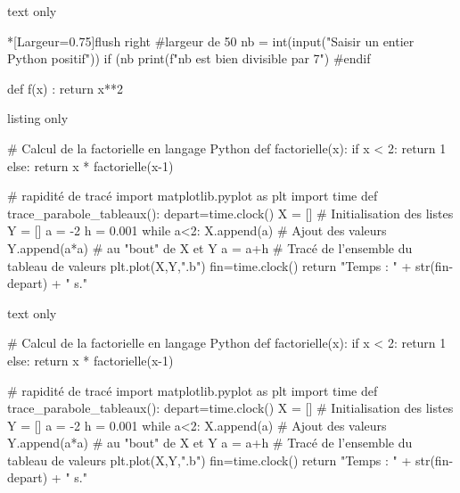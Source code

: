 \begin{PresCodeSortiePL}{text only}
\begin{CodePythonLstAlt}*[Largeur=0.75\linewidth]{flush right}
#largeur de 50%
nb = int(input("Saisir un entier Python positif"))
if (nb %
	print(f"{nb} est bien divisible par 7")
#endif

def f(x) :
	return x**2
\end{CodePythonLstAlt}
\end{PresCodeSortiePL}

\begin{PresCodeTexPL}{listing only}
\begin{scontents}[overwrite,write-out=testscript.py]
# Calcul de la factorielle en langage Python
def factorielle(x):
	if x < 2:
		return 1
	else:
		return x * factorielle(x-1)

# rapidité de tracé
import matplotlib.pyplot as plt
import time
def trace_parabole_tableaux():
	depart=time.clock()
	X = [] # Initialisation des listes
	Y = []
	a = -2
	h = 0.001
	while a<2:
		X.append(a) # Ajout des valeurs
		Y.append(a*a) # au "bout" de X et Y
		a = a+h
	# Tracé de l'ensemble du tableau de valeurs
	plt.plot(X,Y,".b")
	fin=time.clock()
	return "Temps : " + str(fin-depart) + " s."
\end{scontents}

\end{PresCodeTexPL}

\begin{PresCodeSortiePL}{text only}
\begin{scontents}[overwrite,write-out=testscript.py]
# Calcul de la factorielle en langage Python
def factorielle(x):
	if x < 2:
		return 1
	else:
		return x * factorielle(x-1)

# rapidité de tracé
import matplotlib.pyplot as plt
import time
def trace_parabole_tableaux():
	depart=time.clock()
	X = [] # Initialisation des listes
	Y = []
	a = -2
	h = 0.001
	while a<2:
		X.append(a) # Ajout des valeurs
		Y.append(a*a) # au "bout" de X et Y
		a = a+h
	# Tracé de l'ensemble du tableau de valeurs
	plt.plot(X,Y,".b")
	fin=time.clock()
	return "Temps : " + str(fin-depart) + " s."
\end{scontents}

\end{PresCodeSortiePL}

\newpage

